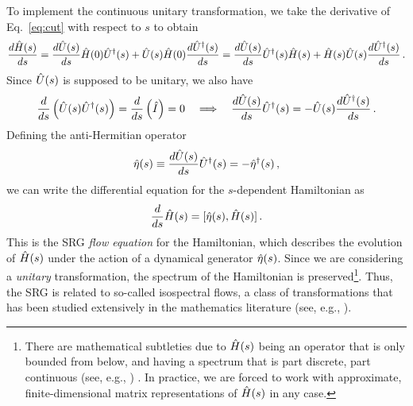 To implement the continuous unitary transformation, we take the derivative of
Eq.~\eqref{eq:cut} with respect to $s$ to obtain 
\begin{equation}
   \frac{d {\hat{H}(s)}} {d {s}}  =  \frac{d {\hat{U}(s)}} {d {s}} \hat{H}(0)\hat{U}^\dag(s) + \hat{U}(s)\hat{H}(0) \frac{d {\hat{U}^\dag(s)}} {d {s}} 
                   =  \frac{d {\hat{U}(s)}} {d {s}} \hat{U}^\dag(s)\hat{H}(s) + \hat{H}(s)\hat{U}(s) \frac{d {\hat{U}^\dag(s)}} {d {s}} \,.
\end{equation}
Since $\hat{U}(s)$ is supposed to be unitary, we also have
\begin{equation}
   \frac{d {}} {d {s}} \left(\hat{U}(s)\hat{U}^\dag(s)\right) =  \frac{d {}} {d {s}}  \left(\hat{I}\right) = 0 \quad \Longrightarrow 
  \quad  \frac{d {\hat{U}(s)}} {d {s}} \hat{U}^\dag(s) = - \hat{U}(s) \frac{d {\hat{U}^\dag(s)}} {d {s}} \,.
\end{equation}
Defining the anti-Hermitian operator
\begin{equation}\label{eq:def_eta}
  \etaO(s) \equiv \totd{\UO(s)}{s} \UUO(s) = - \eetaO(s)\,,
\end{equation}
we can write the differential equation for the $s$-dependent Hamiltonian as
\begin{equation} \label{eq:opflow}
  \totd{}{s} \HO(s) = \comm{\etaO(s)}{\HO(s)}\,.
\end{equation}
This is the SRG \emph{flow equation} for the Hamiltonian, which describes the 
evolution of $\hat{H}(s)$ under the action of a dynamical generator $\hat{\eta}(s)$. 
Since we are considering a \emph{unitary} transformation, the spectrum of the 
Hamiltonian is preserved\footnote{There are mathematical subtleties due to 
$\hat{H}(s)$ being an operator that is only bounded from below, and having a 
spectrum that is part discrete, part continuous (see, e.g., \cite{Bach:2010zr,Boutin:2016ef})
. In practice, we are forced
to work with approximate, finite-dimensional matrix representations of $\hat{H}(s)$
in any case.}. Thus, the SRG is related to so-called isospectral flows, a class 
of transformations that has been studied extensively in the mathematics literature 
(see, e.g., \cite{Brockett:1991kx,Chu:1994vn,Chu:1995ys,Bach:2010zr,Boutin:2016ef}).

